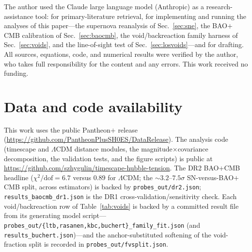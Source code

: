 \documentclass[aps,prd,twocolumn,nofootinbib,superscriptaddress,floatfix]{revtex4-2}
\newcommand{\Lcdm}{\Lambda\mathrm{CDM}}
\begin{document}
\begin{acknowledgments}
The author used the Claude large language model (Anthropic) as a
research-assistance tool: for primary-literature retrieval, for implementing and
running the analyses of this paper---the supernova reanalysis of Sec.~\ref{sec:sne},
the BAO$+$CMB calibration of Sec.~\ref{sec:baocmb}, the void/backreaction family
harness of Sec.~\ref{sec:voids}, and the line-of-sight test of
Sec.~\ref{sec:losvoids}---and for drafting. All
sources, equations, code, and numerical results were verified by the author, who
takes full responsibility for the content and any errors. This work received no
funding.
\end{acknowledgments}

\section*{Data and code availability}
\label{sec:avail}
This work uses the public Pantheon$+$ release~\cite{Scolnic2022,Brout2022}
(\url{https://github.com/PantheonPlusSH0ES/DataRelease}). The analysis code
(timescape and $\Lcdm$ distance modules, the magnitude$\times$covariance
decomposition, the validation tests, and the figure scripts) is public at
\url{https://github.com/szhygulin/timescape-hubble-tension}. The DR2 BAO$+$CMB
headline ($\chi^2/\mathrm{dof}=6.7$ versus $0.89$ for $\Lcdm$; the
$\sim3.2$--$7.5\sigma$ SN-versus-BAO$+$CMB split, across estimators) is backed by
\texttt{probes\_out/dr2.json}; \texttt{results\_baocmb\_dr1.json} is the DR1
cross-validation/sensitivity check. Each void/backreaction row of
Table~\ref{tab:voids} is backed by a committed result file from its generating
model script---\texttt{probes\_out/\{ltb,rasanen,kbc,buchert\}\_family\_fit.json}
(and \texttt{results\_buchert.json})---and the anchor-substituted softening of the
void-fraction split is recorded in \texttt{probes\_out/fvsplit.json}.
\end{document}
